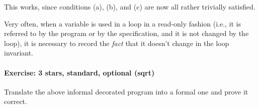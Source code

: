\documentclass[12pt]{report}
\begin{document}
    This works, since conditions (a), (b), and (c) are now all
    rather trivially satisfied.


    Very often, when a variable is used in a loop in a read-only
    fashion (i.e., it is referred to by the program or by the
    specification, and it is not changed by the loop), it is necessary
    to record the \textit{fact} that it doesn't change in the loop invariant. 

\paragraph{Exercise: 3 stars, standard, optional (sqrt)}




    Translate the above informal decorated program into a formal one
    and prove it correct.
\end{document}
